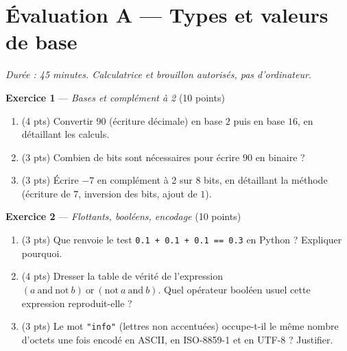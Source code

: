 \section*{Évaluation A --- Types et valeurs de base}
\textit{Durée : 45 minutes. Calculatrice et brouillon autorisés, pas d'ordinateur.}


\bigskip

\textbf{Exercice 1} --- \textit{Bases et complément à 2} \hfill (10 points)

\begin{enumerate}
  \item (4 pts) Convertir $90$ (écriture décimale) en base $2$ puis en base $16$, en détaillant les calculs.
  \item (3 pts) Combien de bits sont nécessaires pour écrire $90$ en binaire ?
  \item (3 pts) Écrire $-7$ en complément à 2 sur $8$ bits, en détaillant la méthode (écriture de $7$, inversion des bits, ajout de $1$).
\end{enumerate}


\bigskip

\textbf{Exercice 2} --- \textit{Flottants, booléens, encodage} \hfill (10 points)

\begin{enumerate}
  \item (3 pts) Que renvoie le test \lstinline{0.1 + 0.1 + 0.1 == 0.3} en Python ? Expliquer pourquoi.
  \item (4 pts) Dresser la table de vérité de l'expression $(a\ \text{and}\ \text{not}\ b)\ \text{or}\ (\text{not}\ a\ \text{and}\ b)$. Quel opérateur booléen usuel cette expression reproduit-elle ?
  \item (3 pts) Le mot \lstinline{"info"} (lettres non accentuées) occupe-t-il le même nombre d'octets une fois encodé en ASCII, en ISO-8859-1 et en UTF-8 ? Justifier.
\end{enumerate}

